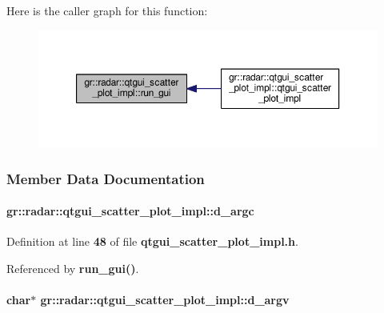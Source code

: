 Here is the caller graph for this function\+:
\nopagebreak
\begin{figure}[H]
\begin{center}
\leavevmode
\includegraphics[width=350pt]{dc/d8a/classgr_1_1radar_1_1qtgui__scatter__plot__impl_aa06a6bf4834396d7ea5e2c39d6fd3216_icgraph}
\end{center}
\end{figure}




\subsubsection{Member Data Documentation}
\paragraph[{d\+\_\+argc}]{ gr\+::radar\+::qtgui\+\_\+scatter\+\_\+plot\+\_\+impl\+::d\+\_\+argc}\label{classgr_1_1radar_1_1qtgui__scatter__plot__impl_ad7a33f248ae32fca3fe9aaa197d31cd5}


Definition at line {\bf 48} of file {\bf qtgui\+\_\+scatter\+\_\+plot\+\_\+impl.\+h}.



Referenced by {\bf run\+\_\+gui()}.

\paragraph[{d\+\_\+argv}]{\setlength{\rightskip}{0pt plus 5cm}char$\ast$ gr\+::radar\+::qtgui\+\_\+scatter\+\_\+plot\+\_\+impl\+::d\+\_\+argv}\label{classgr_1_1radar_1_1qtgui__scatter__plot__impl_a9236fa458c25dfbbc13c9c48d4f6026b}


